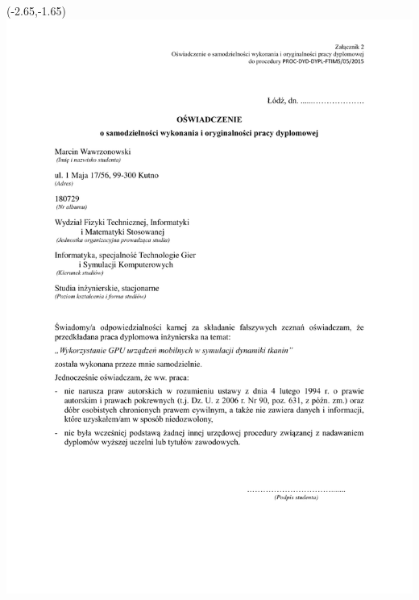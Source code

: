 \documentclass[12pt, oneside, a4paper]{mwbk}
\begin{document}
\begin{textblock}{1}(-2.65,-1.65)
	\includegraphics{figures/zal2.pdf}
\end{textblock}
\newpage
\thispagestyle{empty}
\end{document}
